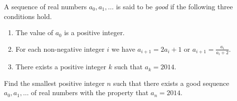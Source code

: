 A sequence of real numbers $a_0, a_1,\ldots$ is said to be \emph{good} if the following three conditions hold.
\begin{enumerate}[label=(\roman*)]
	\item The value of $a_0$ is a positive integer.
	\item For each non-negative integer $i$ we have $a_{i+1} = 2a_i + 1 $ or $a_{i+1} =\frac{a_i}{a_i + 2} $.
	\item There exists a positive integer $k$ such that $a_k = 2014$.
\end{enumerate}
Find the smallest positive integer $n$ such that there exists a good sequence $a_0, a_1,\ldots$ of real numbers with the property that $a_n = 2014$.